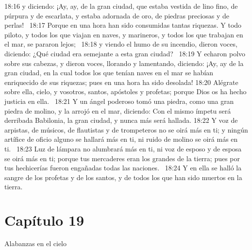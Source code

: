 18:16 y diciendo: ¡Ay, ay, de la gran ciudad, que estaba vestida de lino fino, de púrpura y de escarlata, y estaba adornada de oro, de piedras preciosas y de perlas!  
18:17 Porque en una hora han sido consumidas tantas riquezas. Y todo piloto, y todos los que viajan en naves, y marineros, y todos los que trabajan en el mar, se pararon lejos;  
18:18 y viendo el humo de su incendio, dieron voces, diciendo: ¿Qué ciudad era semejante a esta gran ciudad?  
18:19 Y echaron polvo sobre sus cabezas, y dieron voces, llorando y lamentando, diciendo: ¡Ay, ay de la gran ciudad, en la cual todos los que tenían naves en el mar se habían enriquecido de sus riquezas; pues en una hora ha sido desolada! 
18:20 Alégrate sobre ella, cielo, y vosotros, santos, apóstoles y profetas; porque Dios os ha hecho justicia en ella.  
18:21 Y un ángel poderoso tomó una piedra, como una gran piedra de molino, y la arrojó en el mar, diciendo: Con el mismo ímpetu será derribada Babilonia, la gran ciudad, y nunca más será hallada. 
18:22 Y voz de arpistas, de músicos, de flautistas y de trompeteros no se oirá más en ti; y ningún artífice de oficio alguno se hallará más en ti, ni ruido de molino se oirá más en ti.  
18:23 Luz de lámpara no alumbrará más en ti, ni voz de esposo y de esposa se oirá más en ti; porque tus mercaderes eran los grandes de la tierra; pues por tus hechicerías fueron engañadas todas las naciones.  
18:24 Y en ella se halló la sangre de los profetas y de los santos, y de todos los que han sido muertos en la tierra. 
\section*{Capítulo 19}
Alabanzas en el cielo  

